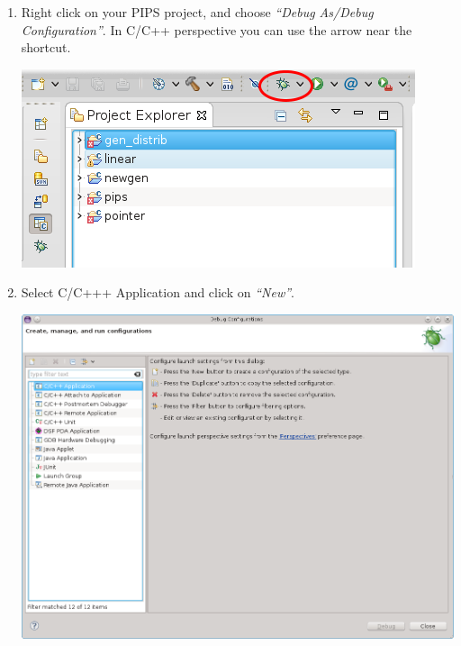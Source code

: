 \documentclass[a4paper]{article}
\begin{document}
\begin{enumerate}
\item Right click on your PIPS project, and choose \emph{``Debug As/Debug Configuration''}. 
In C/C++ perspective you can use the arrow near the shortcut.
\begin{center}
\noindent
\includegraphics[scale=0.4]{eclipse/07-eclipseJUNO-debug1.png}
\end{center}

\item Select C/C+++ Application and click on \emph{``New''}.
\begin{center}
\noindent
\includegraphics[scale=0.35]{eclipse/07-eclipseJUNO-debug2.png}
\end{center}


\end{enumerate}
\end{document}
